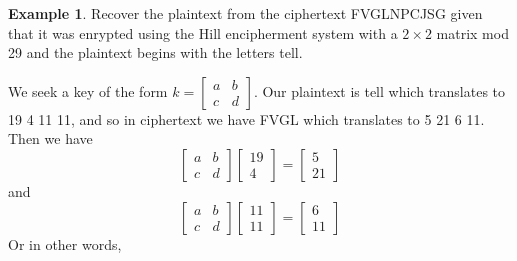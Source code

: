 \documentclass[11pt]{article}
\theoremstyle{definition}\newtheorem{definition}{Definition}
\theoremstyle{definition}\newtheorem{example}{Example}
\theoremstyle{definition}\newtheorem{samplecode}{Sample Code}
\begin{document}
\begin{example}
    Recover the plaintext from the ciphertext FVGLNPCJSG given that it was enrypted using the Hill encipherment system with a $2 \times 2$ matrix mod 29 and the plaintext begins with the letters tell.
\end{example}

We seek a key of the form $k = \begin{bmatrix} a & b \\ c & d \end{bmatrix}$. Our plaintext is tell which translates to 19 4 11 11, and so in ciphertext we have FVGL which translates to 5 21 6 11. Then we have
\begin{equation*}
    \begin{bmatrix} a & b \\ c & d \end{bmatrix}\begin{bmatrix} 19 \\ 4 \end{bmatrix} = \begin{bmatrix} 5 \\ 21 \end{bmatrix}
\end{equation*}
and
\begin{equation*}
    \begin{bmatrix} a & b \\ c & d \end{bmatrix}\begin{bmatrix} 11 \\ 11 \end{bmatrix} = \begin{bmatrix} 6 \\ 11 \end{bmatrix}
\end{equation*}
Or in other words,
\end{document}

